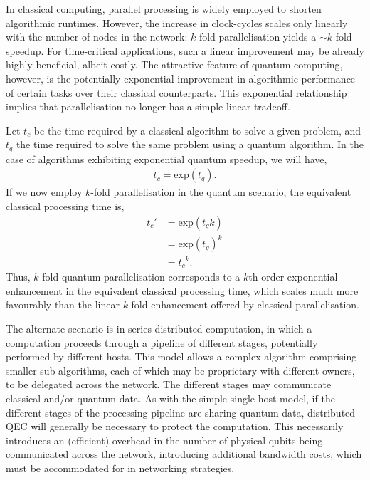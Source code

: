 \documentclass[aps,rmp,twocolumn,amsmath,amssymb,nofootinbib,superscriptaddress,longbibliography,floatfix]{revtex4-1}
\begin{document}
In classical computing, parallel processing is widely employed to shorten algorithmic runtimes. However, the increase in clock-cycles scales only linearly with the number of nodes in the network: $k$-fold parallelisation yields a \mbox{$\sim k$}-fold speedup. For time-critical applications, such a linear improvement may be already highly beneficial, albeit costly. The attractive feature of quantum computing, however, is the potentially exponential improvement in algorithmic performance of certain tasks over their classical counterparts. This exponential relationship implies that parallelisation no longer has a simple linear tradeoff.

Let $t_c$ be the time required by a classical algorithm to solve a given problem, and $t_q$ the time required to solve the same problem using a quantum algorithm. In the case of algorithms exhibiting exponential quantum speedup, we will have,
\begin{align}
t_c = \mathrm{exp}(t_q).
\end{align}
If we now employ $k$-fold parallelisation in the quantum scenario, the equivalent classical processing time is,
\begin{align}
t_c' &= \mathrm{exp}(t_q k) \nonumber \\
&= \mathrm{exp}(t_q)^{k} \nonumber \\
&= {t_c}^{k}.
\end{align}
Thus, $k$-fold quantum parallelisation corresponds to a $k$th-order exponential enhancement in the equivalent classical processing time, which scales much more favourably than the linear $k$-fold enhancement offered by classical parallelisation.

The alternate scenario is in-series distributed computation, in which a computation proceeds through a pipeline of different stages, potentially performed by different hosts. This model allows a complex algorithm comprising smaller sub-algorithms, each of which may be proprietary with different owners, to be delegated across the network. The different stages may communicate classical and/or quantum data. As with the simple single-host model, if the different stages of the processing pipeline are sharing quantum data, distributed QEC will generally be necessary to protect the computation. This necessarily introduces an (efficient) overhead in the number of physical qubits being communicated across the network, introducing additional bandwidth costs, which must be accommodated for in networking strategies.

%
%
\end{document}
